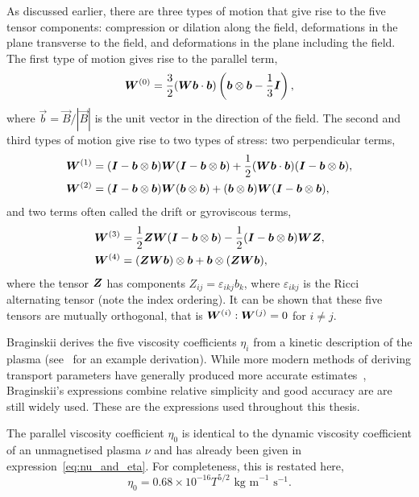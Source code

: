 As discussed earlier, there are three types of motion that give rise to the five tensor components: compression or dilation along the field, deformations in the plane transverse to the field, and deformations in the plane including the field. The first type of motion gives rise to the parallel term,
\begin{equation}
  \label{eq:braginskii_parallel_term}
  {\bm W}^{(0)} = \frac{3}{2}({\bm W}{\bm b}\cdot{\bm b}) \left( {\bm b} \otimes {\bm b} - \frac{1}{3}{\bm I} \right),
\end{equation}
where $\vec{b} = \vec{B}/|\vec{B}|$ is the unit vector in the direction of the field. The second and third types of motion give rise to two types of stress: two perpendicular terms,
\begin{align}
{\bm W}^{(1)} &= ({\bm I} - {\bm b} \otimes {\bm b}){\bm W}({\bm I} - {\bm b} \otimes {\bm b}) + \frac{1}{2}({\bm W}{\bm b} \cdot {\bm b})({\bm I} - {\bm b} \otimes {\bm b}), \\
{\bm W}^{(2)} &= ({\bm I} - {\bm b} \otimes {\bm b}){\bm W}({\bm b} \otimes {\bm b}) + ({\bm b} \otimes {\bm b}){\bm W}({\bm I} - {\bm b} \otimes {\bm b}),
\end{align}
and two terms often called the drift or gyroviscous terms,
\begin{align}
{\bm W}^{(3)} &= \frac{1}{2} {\bm Z}{\bm W}({\bm I} - {\bm b} \otimes {\bm b}) - \frac{1}{2}({\bm I} - {\bm b} \otimes {\bm b}){\bm W}{\bm Z}, \\
{\bm W}^{(4)} &= ({\bm Z}{\bm W}{\bm b}) \otimes {\bm b} + {\bm b} \otimes ({\bm Z} {\bm W} {\bm b}),
\label{eq:drift_terms}
\end{align}
where the tensor ${\bm Z}$ has components $Z_{ij} = \varepsilon_{ikj}b_k$, where $\varepsilon_{ikj}$ is the Ricci alternating tensor (note the index ordering). It can be shown that these five tensors are mutually orthogonal, that is ${\bm W}^{(i)}:{\bm W}^{(j)} = 0$ for $i\ne j$.

Braginskii derives the five viscosity coefficients $\eta_i$ from a kinetic description of the plasma (see~\cite{epperleinPlasmaTransportCoefficients1986} for an example derivation). While more modern methods of deriving transport parameters have generally produced more accurate estimates~\cite{epperleinPlasmaTransportCoefficients1986}, Braginskii's expressions combine relative simplicity and good accuracy are are still widely used. These are the expressions used throughout this thesis.

The parallel viscosity coefficient $\eta_0$ is identical to the dynamic viscosity coefficient of an unmagnetised plasma $\nu$ and has already been given in expression~\eqref{eq:nu_and_eta}. For completeness, this is restated here,
\begin{equation}
\label{eq:nu}
\eta_0 = 0.68 \times 10^{-16} T^{5/2} \text{ kg m}^{-1} \text{ s}^{-1}.
\end{equation}

